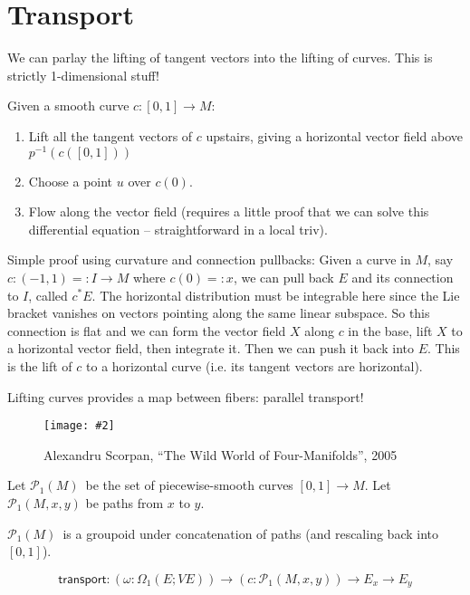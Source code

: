 \documentclass[12pt]{article}
\newcommand{\transport}{\ensuremath{\textsf{transport}}}
\newcommand{\pathm}{\ensuremath{\mathcal{P}_1 (M)}}
\newcommand{\pp}{\ensuremath{\mathcal{P}_1}}
\newcommand{\myfig}[2]{\begin{figure}[h]\caption{#1}\centering\texttt{[image: \#2]}\end{figure}}
\begin{document}
\section{Transport}
We can parlay the lifting of tangent vectors into the lifting of curves. This is strictly 1-dimensional stuff!

Given a smooth curve $c:[0, 1]\to M$:
\begin{enumerate}
	\item Lift all the tangent vectors of $c$ upstairs, giving a horizontal vector field above $p^{-1}(c([0,1]))$
	\item Choose a point $u$ over $c(0)$.
	\item Flow along the vector field (requires a little proof that we can solve this differential equation -- straightforward in a local triv).
\end{enumerate}

\begin{tcolorbox}
Simple proof using curvature and connection pullbacks: Given a curve in $M$, say $c:(-1, 1)=:I \to M$ where $c(0)=:x$, we can pull back $E$ and its connection to $I$, called $c^*E$. The horizontal distribution must be integrable here since the Lie bracket vanishes on vectors pointing along the same linear subspace. So this connection is flat and we can form the vector field $X$ along $c$ in the base, lift $X$ to a horizontal vector field, then integrate it. Then we can push it back into $E$. This is the lift of $c$ to a horizontal curve (i.e. its tangent vectors are horizontal).
\end{tcolorbox}

Lifting curves provides a map between fibers: parallel transport!

\myfig{Alexandru Scorpan, ``The Wild World of Four-Manifolds'', 2005 \cite{scorpan_wild_2005}}{scorpan_transport}

Let \pathm\ be the set of piecewise-smooth curves $[0, 1]\to M$. Let $\pp(M, x, y)$ be paths from $x$ to $y$.

\pathm\ is a groupoid under concatenation of paths (and rescaling back into $[0, 1]$).

$$\transport: (\omega : \Omega_1(E; VE))\to (c: \pp(M,x,y)) \to E_{x} \to E_{y}$$
\end{document}
